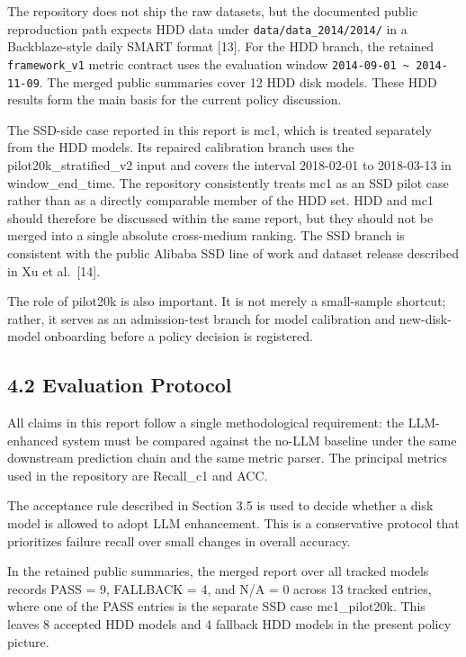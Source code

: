 \documentclass[
  11pt,
  a4paper]{article}
\begin{document}
The repository does not ship the raw datasets, but the documented public
reproduction path expects HDD data under \texttt{data/data\_2014/2014/}
in a Backblaze-style daily SMART format {[}13{]}. For the HDD branch,
the retained \texttt{framework\_v1} metric contract uses the evaluation
window \texttt{2014-09-01\ \textasciitilde{}\ 2014-11-09}. The merged
public summaries cover 12 HDD disk models. These HDD results form the
main basis for the current policy discussion.

The SSD-side case reported in this report is mc1, which is treated
separately from the HDD models. Its repaired calibration branch uses the
pilot20k\_stratified\_v2 input and covers the interval 2018-02-01 to
2018-03-13 in window\_end\_time. The repository consistently treats mc1
as an SSD pilot case rather than as a directly comparable member of the
HDD set. HDD and mc1 should therefore be discussed within the same
report, but they should not be merged into a single absolute
cross-medium ranking. The SSD branch is consistent with the public
Alibaba SSD line of work and dataset release described in Xu et
al.~{[}14{]}.

The role of pilot20k is also important. It is not merely a small-sample
shortcut; rather, it serves as an admission-test branch for model
calibration and new-disk-model onboarding before a policy decision is
registered.

\hypertarget{evaluation-protocol}{%
\subsection{4.2 Evaluation Protocol}\label{evaluation-protocol}}

All claims in this report follow a single methodological requirement:
the LLM-enhanced system must be compared against the no-LLM baseline
under the same downstream prediction chain and the same metric parser.
The principal metrics used in the repository are Recall\_c1 and ACC.

The acceptance rule described in Section 3.5 is used to decide whether a
disk model is allowed to adopt LLM enhancement. This is a conservative
protocol that prioritizes failure recall over small changes in overall
accuracy.

In the retained public summaries, the merged report over all tracked
models records PASS = 9, FALLBACK = 4, and N/A = 0 across 13 tracked
entries, where one of the PASS entries is the separate SSD case
mc1\_pilot20k. This leaves 8 accepted HDD models and 4 fallback HDD
models in the present policy picture.
\end{document}

